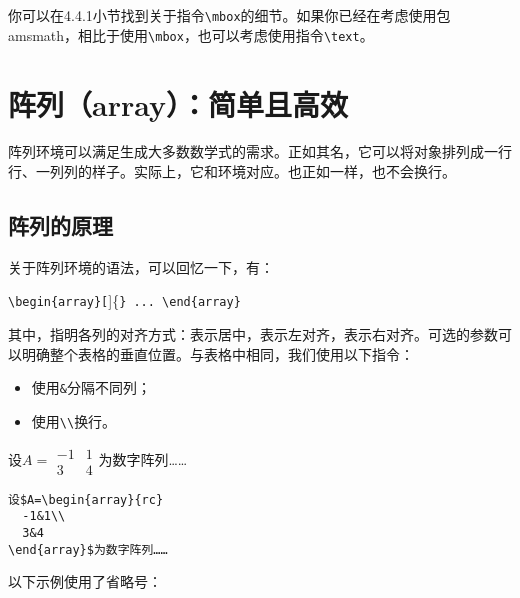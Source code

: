 你可以在4.4.1小节找到关于指令\verb|\mbox|的细节。如果你已经在考虑使用包\textsf{amsmath}，相比于使用\verb|\mbox|，也可以考虑使用指令\verb|\text|。

\section{阵列（array）：简单且高效}

阵列环境可以满足生成大多数数学式的需求。正如其名，它可以将对象排列成一行行、一列列的样子。实际上，它和环境对应。也正如一样，也不会换行。

\subsection{阵列的原理}

关于阵列环境的语法，可以回忆一下，有：

\begin{dmd}
\verb|\begin{array}[|]\{\verb|} ... \end{array}|
\end{dmd}

其中，指明各列的对齐方式：表示居中，表示左对齐，表示右对齐。可选的参数可以明确整个表格的垂直位置。与表格中相同，我们使用以下指令：

\begin{itemize}
  \item 使用\verb|&|分隔不同列；
  \item 使用\verb|\\|换行。
\end{itemize}

\begin{codelist}[3.14]{
  设$A=\begin{array}{rc}
    -1&1\\
    3&4
  \end{array}$为数字阵列……
}
\begin{verbatim}
设$A=\begin{array}{rc}
  -1&1\\
  3&4
\end{array}$为数字阵列……\end{verbatim}
\end{codelist}

以下示例使用了省略号：

